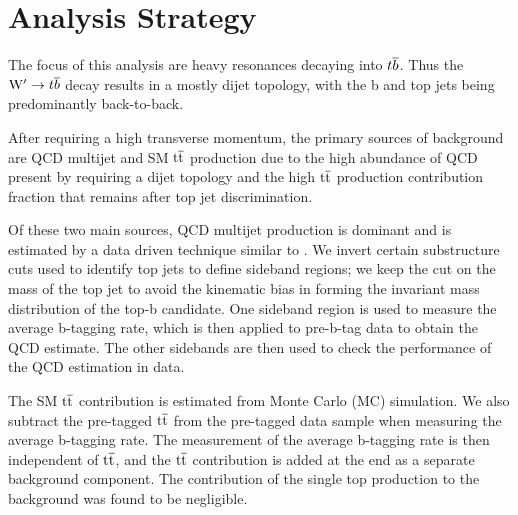 \chapter{Analysis Strategy}
\label{sec:analysisStrategy}


The focus of this analysis are heavy resonances decaying into
${t\overline{b}}$.  Thus the $\mathrm{W}^\prime \to {t\overline{b}}$ decay results in a mostly
dijet topology, with the b and top jets being  predominantly back-to-back. 

After requiring a high transverse momentum, 
the primary sources of background are QCD multijet and SM $\mathrm{t\overline{t}}$ 
production due to the high abundance of QCD present by requiring a dijet topology and the high $\mathrm{t\overline{t}}$ production contribution fraction that remains after top jet discrimination. 

Of these two main sources, QCD multijet production is dominant and is estimated by a data driven technique similar 
to \cite{7tevZprime}.  We
invert certain substructure cuts used to identify top jets
to define sideband regions; we keep the cut on the mass of the
top jet to avoid the kinematic bias in forming the invariant mass
distribution of the top-b candidate.  One sideband region is used
to measure the average b-tagging rate, which is then applied to
pre-b-tag data to obtain the QCD estimate.  The other sidebands are
then used to check the performance of the QCD estimation in data.

The SM $\mathrm{t\overline{t}}$ contribution is estimated from Monte Carlo (MC) simulation.
We also subtract the pre-tagged $\mathrm{t\overline{t}}$ from the pre-tagged data sample when
measuring the average b-tagging rate.  The measurement
of the average b-tagging rate is then independent of $\mathrm{t\overline{t}}$, and the 
$\mathrm{t\overline{t}}$ contribution is added at the end as a separate background
component.
The contribution of the single top production to the background was
found to be negligible.

